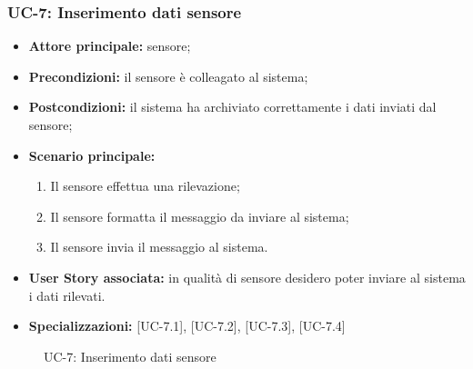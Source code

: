 \documentclass[8pt]{article}
\begin{document}
\subsubsection*{UC-7: Inserimento dati sensore}
\begin{itemize}
    \item \textbf{Attore principale:} sensore;
    \item \textbf{Precondizioni:} il sensore è colleagato al sistema;
    \item \textbf{Postcondizioni:} il sistema ha archiviato correttamente i dati inviati dal sensore;
    \item \textbf{Scenario principale:}
        \begin{enumerate}
        \item Il sensore effettua una rilevazione;
        \item Il sensore formatta il messaggio da inviare al sistema;
        \item Il sensore invia il messaggio al sistema.
        \end{enumerate}
    \item \textbf{User Story associata:} in qualità di sensore desidero poter inviare al sistema i
        dati rilevati.
    \item \textbf{Specializzazioni:} [UC-7.1], [UC-7.2], [UC-7.3], [UC-7.4]
\end{itemize}

\begin{figure}[ht!]
    \centering
    \caption{UC-7: Inserimento dati sensore}
    \label{fig:UC-7: Inserimento dati sensore}
\end{figure}
\end{document}
